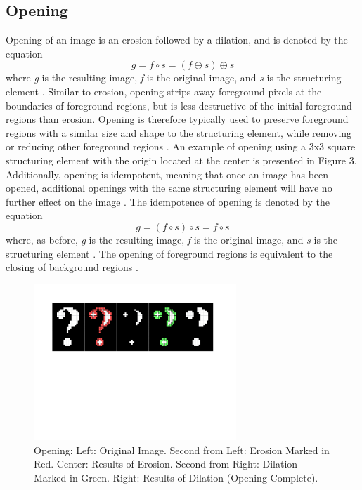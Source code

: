 \documentclass{sig-alternate}
\begin{document}
\subsection{Opening}\label{opening}
Opening of an image is an erosion followed by a dilation, and is denoted by the equation
\begin{equation*}
g = f \circ s = (f \ominus s) \oplus s
\end{equation*}
where \textit{g} is the resulting image, \textit{f} is the original image, and \textit{s} is the structuring element \cite{MorphologyWikiAnonymous, MorphologyBook:2000}. Similar to erosion, opening strips away foreground pixels at the boundaries of foreground regions, but is less destructive of the initial foreground regions than erosion. Opening is therefore typically used to preserve foreground regions with a similar size and shape to the structuring element, while removing or reducing other foreground regions \cite{MorphologyWiki}. An example of opening using a 3x3 square structuring element with the origin located at the center is presented in Figure 3. Additionally, opening is idempotent, meaning that once an image has been opened, additional openings with the same structuring element will have no further effect on the image \cite{MorphologyWiki, MorphologyPaper:1987}. The idempotence of opening is denoted by the equation
\begin{equation*}
g = (f \circ s) \circ s = f \circ s
\end{equation*}
where, as before, \textit{g} is the resulting image, \textit{f} is the original image, and \textit{s} is the structuring element \cite{MorphologyWikiAnonymous}. The opening of foreground regions is equivalent to the closing of background regions \cite{MorphologyWiki}.
\begin{figure}
\centering
\includegraphics[width=3in,trim={0 4.75in 0 0},clip]{opening}
\caption{Opening: Left: Original Image. Second from Left: Erosion Marked in Red. Center: Results of Erosion. Second from Right: Dilation Marked in Green. Right: Results of Dilation (Opening Complete).}
\end{figure}
\end{document}
